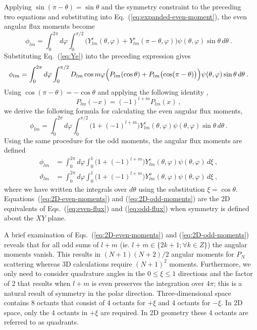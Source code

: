 \documentclass{article}
\numberwithin{equation}{subsection}
\begin{document}
Applying $\sin(\pi-\theta) = \sin\theta$ and the symmetry constraint to the
preceding two equations and substituting into
Eq.~(\ref{eq:expanded-even-moment}), the even angular flux moments become
\begin{equation}
  \phi_{lm} = \int_{0}^{2\pi}d\varphi
  \int_{0}^{\pi/2}\bigl(Y^e_{lm}(\theta,\varphi) +
  Y^e_{lm}(\pi-\theta,\varphi)\bigr)\psi(\theta,\varphi)
    \sin\theta\,d\theta\:.
\end{equation}
Substituting Eq.~(\ref{eq:Ye}) into the preceding expression gives
\begin{equation}
  \phi_{lm} = \int_{0}^{2\pi}d\varphi
  \int_{0}^{\pi/2}
  D_{lm}\cos m\varphi\Bigl(
  P_{lm}(\cos\theta) +
  P_{lm}\bigl(\cos(\pi-\theta)\bigr)
  \Bigr)
  \psi(\theta,\varphi)\sin\theta\,d\theta\:.
\end{equation}
Using $\cos(\pi-\theta)=-\cos\theta$ and applying the following identity
\cite{arfken},
\begin{equation}
  P_{lm}(-x) = (-1)^{l+m}P_{lm}(x)\:,
\end{equation}
we derive the following formula for calculating the even angular flux moments,
\begin{equation}
  \phi_{lm} = \int_{0}^{2\pi}d\varphi
  \int_{0}^{\pi/2}
  \bigl(1 + (-1)^{l+m}\bigr)
  Y^e_{lm}(\theta,\varphi)\psi(\theta,\varphi)\sin\theta\,d\theta\:.
\end{equation}
Using the same procedure for the odd moments, the angular flux moments are
defined
\begin{align}
  \phi_{lm} &= \int_{0}^{2\pi}d\varphi
  \int_{0}^{1}
  \bigl(1 + (-1)^{l+m}\bigr)
  Y^e_{lm}(\theta,\varphi)\psi(\theta,\varphi)\,d\xi\:,
  \label{eq:2D-even-moments}\\
  \vartheta_{lm} &= \int_{0}^{2\pi}d\varphi
  \int_{0}^{1}
  \bigl(1 + (-1)^{l+m}\bigr)
  Y^o_{lm}(\theta,\varphi)\psi(\theta,\varphi)\,d\xi\:,
  \label{eq:2D-odd-moments}
\end{align}
where we have written the integrals over $d\theta$ using the substitution
$\xi=\cos\theta$.  Equations~(\ref{eq:2D-even-moments}) and
(\ref{eq:2D-odd-moments}) are the 2D equivalents of Eqs.~(\ref{eq:even-flux})
and (\ref{eq:odd-flux}) when symmetry is defined about the $XY$ plane.

A brief examination of Eqs.~(\ref{eq:2D-even-moments}) and
(\ref{eq:2D-odd-moments}) reveals that for all odd sums of $l+m$ (ie.
$l+m\in\{2k+1; \forall k\in Z\}$) the angular moments vanish. This results in
$(N+1)(N+2)/2$ angular moments for $P_N$ scattering whereas 3D calculations
require $(N+1)^2$ moments.  Furthermore, we only need to consider quadrature
angles in the $0\le\xi\le 1$ directions and the factor of 2 that results when
$l+m$ is even preserves the integration over $4\pi$; this is a natural result
of symmetry in the polar direction.  Three-dimensional space contains 8
octants that consist of 4 octants for $+\xi$ and 4 octants for $-\xi$.  In 2D
space, only the 4 octants in $+\xi$ are required.  In 2D geometry these 4
octants are referred to as quadrants.
\end{document}
